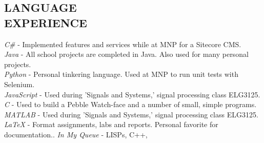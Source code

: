 \documentclass[margin]{res}
\begin{document}
\begin{resume}
\section{LANGUAGE \\ EXPERIENCE} 
{\sl C\#} - Implemented features and services while at MNP for a Sitecore CMS.\\
{\sl Java} - All school projects are completed in Java. Also used for many personal projects.\\
{\sl Python} - Personal tinkering language. Used at MNP to run unit tests with Selenium.\\
{\sl JavaScript} - Used during 'Signals and Systems,' signal processing class ELG3125.\\
{\sl C} - Used to build a Pebble Watch-face and a number of small, simple programs.\\
{\sl MATLAB} - Used during 'Signals and Systems,' signal processing class ELG3125.\\
{\sl LaTeX} -  Format assignments, labs and reports. Personal favorite for documentation..
{\sl In My Queue} - LISPs, C++, 


\end{resume}
\end{document}
